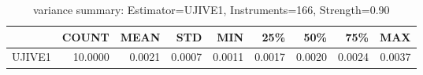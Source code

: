 \begin{table}[ht]
\centering
\caption{variance summary: Estimator=UJIVE1, Instruments=166, Strength=0.90}
\begin{tabular}{lrrrrrrrr}
\toprule
 & COUNT & MEAN & STD & MIN & 25\% & 50\% & 75\% & MAX \\
\midrule
UJIVE1 & 10.0000 & 0.0021 & 0.0007 & 0.0011 & 0.0017 & 0.0020 & 0.0024 & 0.0037 \\
\bottomrule
\end{tabular}
\end{table}
